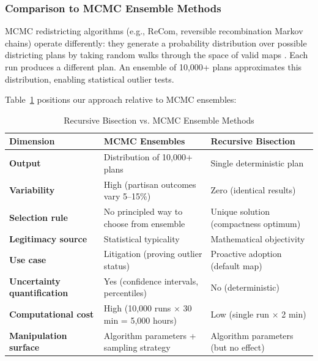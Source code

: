 \subsubsection{Comparison to MCMC Ensemble Methods}

MCMC redistricting algorithms (e.g., ReCom, reversible recombination Markov chains) operate differently: they generate a probability distribution over possible districting plans by taking random walks through the space of valid maps \cite{deford2019implementing,duchin2018gerrymandering}. Each run produces a different plan. An ensemble of 10,000+ plans approximates this distribution, enabling statistical outlier tests.

Table~\ref{tab:method_comparison} positions our approach relative to MCMC ensembles:

\begin{table}[h]
\centering
\caption{Recursive Bisection vs. MCMC Ensemble Methods}
\label{tab:method_comparison}
\small
\begin{tabular}{p{3cm}p{5cm}p{5cm}}
\toprule
\textbf{Dimension} & \textbf{MCMC Ensembles} & \textbf{Recursive Bisection} \\
\midrule
\textbf{Output} & Distribution of 10,000+ plans & Single deterministic plan \\
\textbf{Variability} & High (partisan outcomes vary 5--15\%) & Zero (identical results) \\
\textbf{Selection rule} & No principled way to choose from ensemble & Unique solution (compactness optimum) \\
\textbf{Legitimacy source} & Statistical typicality & Mathematical objectivity \\
\textbf{Use case} & Litigation (proving outlier status) & Proactive adoption (default map) \\
\textbf{Uncertainty quantification} & Yes (confidence intervals, percentiles) & No (deterministic) \\
\textbf{Computational cost} & High (10,000 runs $\times$ 30 min = 5,000 hours) & Low (single run $\times$ 2 min) \\
\textbf{Manipulation surface} & Algorithm parameters + sampling strategy & Algorithm parameters (but no effect) \\
\bottomrule
\end{tabular}
\end{table}

